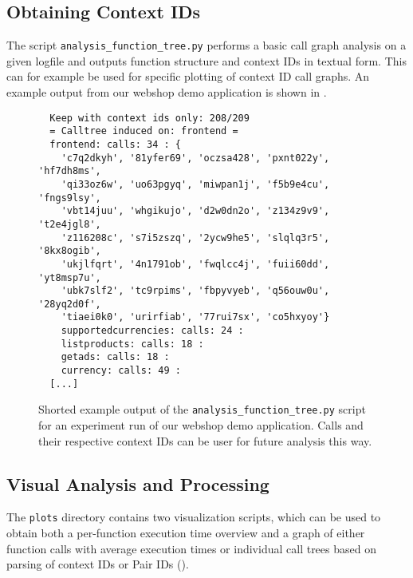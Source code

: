 \documentclass[../main.tex]{subfiles}
\begin{document}
\subsection{Obtaining Context IDs}%
\label{sub:analysisUsageContextIDs}

The script \texttt{analysis\_function\_tree.py} performs a basic call graph analysis on a given logfile
and outputs function structure and context IDs in textual form. 
This can for example be used for specific plotting of context ID call graphs.
An example output from our webshop demo application is shown in .

\begin{figure}
\begin{tcolorbox}
  \begin{verbatim}
  Keep with context ids only: 208/209
  = Calltree induced on: frontend =
  frontend: calls: 34 : {
    'c7q2dkyh', '81yfer69', 'oczsa428', 'pxnt022y', 'hf7dh8ms', 
    'qi33oz6w', 'uo63pgyq', 'miwpan1j', 'f5b9e4cu', 'fngs9lsy', 
    'vbt14juu', 'whgikujo', 'd2w0dn2o', 'z134z9v9', 't2e4jgl8', 
    'z116208c', 's7i5zszq', '2ycw9he5', 'slqlq3r5', '8kx8ogib', 
    'ukjlfqrt', '4n1791ob', 'fwqlcc4j', 'fuii60dd', 'yt8msp7u', 
    'ubk7slf2', 'tc9rpims', 'fbpyvyeb', 'q56ouw0u', '28yq2d0f', 
    'tiaei0k0', 'urirfiab', '77rui7sx', 'co5hxyoy'}
    supportedcurrencies: calls: 24 :
    listproducts: calls: 18 :
    getads: calls: 18 :
    currency: calls: 49 :
  [...]
  \end{verbatim}
\end{tcolorbox}
\caption[Function Tree Script Example]{%
  Shorted example output of the \texttt{analysis\_function\_tree.py} script for 
  an experiment run of our webshop demo application.
  Calls and their respective context IDs can be user for future analysis this way.%
}%
\label{fig:contextIDExtractExample}
\end{figure}

\subsection{Visual Analysis and Processing}%
\label{sub:analysisUsageVisualProcessing}

The \texttt{plots} directory contains two visualization scripts, 
which can be used to obtain both a per-function execution time overview and 
a graph of either function calls with average execution times or individual call trees based on parsing of context IDs or Pair IDs
().
\end{document}

